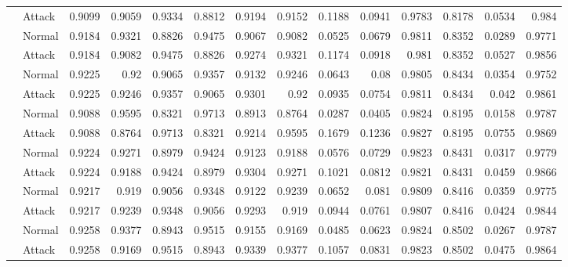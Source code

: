 \begin{tabular}{llrrrrrrrrrrrr}
                & Attack     &     0.9099 &      0.9059 &   0.9334 &        0.8812 &     0.9194 & 0.9152 & 0.1188 & 0.0941 &    0.9783 & 0.8178 & 0.0534 &   0.984  \\
                & Normal     &     0.9184 &      0.9321 &   0.8826 &        0.9475 &     0.9067 & 0.9082 & 0.0525 & 0.0679 &    0.9811 & 0.8352 & 0.0289 &   0.9771 \\
                & Attack     &     0.9184 &      0.9082 &   0.9475 &        0.8826 &     0.9274 & 0.9321 & 0.1174 & 0.0918 &    0.981  & 0.8352 & 0.0527 &   0.9856 \\
                & Normal     &     0.9225 &      0.92   &   0.9065 &        0.9357 &     0.9132 & 0.9246 & 0.0643 & 0.08   &    0.9805 & 0.8434 & 0.0354 &   0.9752 \\
                & Attack     &     0.9225 &      0.9246 &   0.9357 &        0.9065 &     0.9301 & 0.92   & 0.0935 & 0.0754 &    0.9811 & 0.8434 & 0.042  &   0.9861 \\
                & Normal     &     0.9088 &      0.9595 &   0.8321 &        0.9713 &     0.8913 & 0.8764 & 0.0287 & 0.0405 &    0.9824 & 0.8195 & 0.0158 &   0.9787 \\
                & Attack     &     0.9088 &      0.8764 &   0.9713 &        0.8321 &     0.9214 & 0.9595 & 0.1679 & 0.1236 &    0.9827 & 0.8195 & 0.0755 &   0.9869 \\
                & Normal     &     0.9224 &      0.9271 &   0.8979 &        0.9424 &     0.9123 & 0.9188 & 0.0576 & 0.0729 &    0.9823 & 0.8431 & 0.0317 &   0.9779 \\
                & Attack     &     0.9224 &      0.9188 &   0.9424 &        0.8979 &     0.9304 & 0.9271 & 0.1021 & 0.0812 &    0.9821 & 0.8431 & 0.0459 &   0.9866 \\
                & Normal     &     0.9217 &      0.919  &   0.9056 &        0.9348 &     0.9122 & 0.9239 & 0.0652 & 0.081  &    0.9809 & 0.8416 & 0.0359 &   0.9775 \\
                & Attack     &     0.9217 &      0.9239 &   0.9348 &        0.9056 &     0.9293 & 0.919  & 0.0944 & 0.0761 &    0.9807 & 0.8416 & 0.0424 &   0.9844 \\
                & Normal     &     0.9258 &      0.9377 &   0.8943 &        0.9515 &     0.9155 & 0.9169 & 0.0485 & 0.0623 &    0.9824 & 0.8502 & 0.0267 &   0.9787 \\
                & Attack     &     0.9258 &      0.9169 &   0.9515 &        0.8943 &     0.9339 & 0.9377 & 0.1057 & 0.0831 &    0.9823 & 0.8502 & 0.0475 &   0.9864 \\

\end{tabular}

